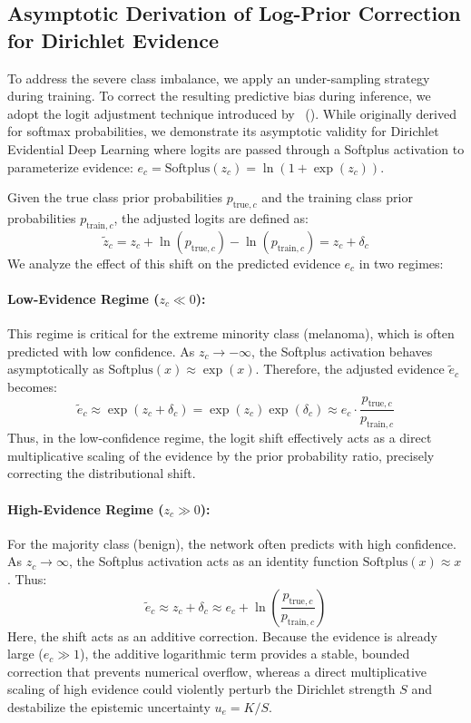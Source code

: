 \documentclass[letterpaper]{article} %
\begin{document}
\subsection{Asymptotic Derivation of Log-Prior Correction for Dirichlet Evidence}\label{subsec:log_prior}
To address the severe class imbalance, we apply an under-sampling strategy during training. To correct the resulting predictive bias during inference, we adopt the logit adjustment technique introduced by \citeauthor{menon2021long}~(\citeyear{menon2021long}). While originally derived for softmax probabilities, we demonstrate its asymptotic validity for Dirichlet Evidential Deep Learning where logits are passed through a Softplus activation to parameterize evidence: $e_c = \text{Softplus}(z_c) = \ln(1 + \exp(z_c))$.

Given the true class prior probabilities $p_{\text{true}, c}$ and the training class prior probabilities $p_{\text{train}, c}$, the adjusted logits are defined as:
\begin{equation}
    \tilde{z}_c = z_c + \ln(p_{\text{true}, c}) - \ln(p_{\text{train}, c}) = z_c + \delta_c
\end{equation}
We analyze the effect of this shift on the predicted evidence $e_c$ in two regimes:

\paragraph{Low-Evidence Regime ($z_c \ll 0$):} This regime is critical for the extreme minority class (melanoma), which is often predicted with low confidence. As $z_c \to -\infty$, the Softplus activation behaves asymptotically as $\text{Softplus}(x) \approx \exp(x)$. Therefore, the adjusted evidence $\tilde{e}_c$ becomes:
\begin{equation}
    \tilde{e}_c \approx \exp(z_c + \delta_c) = \exp(z_c) \exp(\delta_c) \approx e_c \cdot \frac{p_{\text{true}, c}}{p_{\text{train}, c}}
\end{equation}
Thus, in the low-confidence regime, the logit shift effectively acts as a direct multiplicative scaling of the evidence by the prior probability ratio, precisely correcting the distributional shift.

\paragraph{High-Evidence Regime ($z_c \gg 0$):} For the majority class (benign), the network often predicts with high confidence. As $z_c \to \infty$, the Softplus activation acts as an identity function $\text{Softplus}(x) \approx x$. Thus:
\begin{equation}
    \tilde{e}_c \approx z_c + \delta_c \approx e_c + \ln\left(\frac{p_{\text{true}, c}}{p_{\text{train}, c}}\right)
\end{equation}
Here, the shift acts as an additive correction. Because the evidence is already large ($e_c \gg 1$), the additive logarithmic term provides a stable, bounded correction that prevents numerical overflow, whereas a direct multiplicative scaling of high evidence could violently perturb the Dirichlet strength $S$ and destabilize the epistemic uncertainty $u_e = K/S$.
\end{document}
